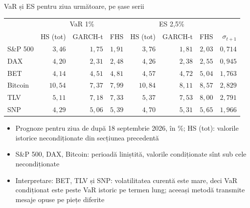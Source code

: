 \begin{frame}{VaR și ES pentru ziua următoare, pe șase serii}
\itemsize{\footnotesize}
\begin{center}
\footnotesize
\begin{tabular}{lrrrrrrr}
\toprule
& \multicolumn{3}{c}{VaR 1\%} & \multicolumn{3}{c}{ES 2,5\%} & \\ & HS (tot) & GARCH-t & FHS & HS (tot) & GARCH-t & FHS & $\sigma_{t+1}$ \\
\midrule
S\&P 500 & $3{,}46$ & $1{,}75$ & $1{,}91$ & $3{,}76$ & $1{,}81$ & $2{,}03$ & $0{,}714$ \\
DAX & $4{,}20$ & $2{,}31$ & $2{,}48$ & $4{,}26$ & $2{,}38$ & $2{,}55$ & $0{,}945$ \\
BET & $4{,}14$ & $4{,}51$ & $4{,}81$ & $4{,}57$ & $4{,}72$ & $5{,}04$ & $1{,}763$ \\
Bitcoin & $10{,}54$ & $7{,}37$ & $7{,}99$ & $10{,}84$ & $8{,}11$ & $8{,}57$ & $2{,}829$ \\
TLV & $5{,}11$ & $7{,}18$ & $7{,}33$ & $5{,}37$ & $7{,}53$ & $8{,}00$ & $2{,}791$ \\
SNP & $4{,}29$ & $5{,}06$ & $5{,}39$ & $4{,}70$ & $5{,}31$ & $5{,}65$ & $1{,}966$ \\
\bottomrule
\end{tabular}
\end{center}
\begin{itemize}
    \item Prognoze pentru ziua de după 18 septembrie 2026, în \%; HS (tot): valorile istorice necondiționate din secțiunea precedentă
    \item S\&P 500, DAX, Bitcoin: perioadă liniștită, valorile condiționate sînt sub cele necondiționate
    \item Interpretare: BET, TLV și SNP: volatilitatea curentă este mare, deci VaR condiționat este peste VaR istoric pe termen lung; aceeași metodă transmite mesaje opuse pe piețe diferite
\end{itemize}
\end{frame}

